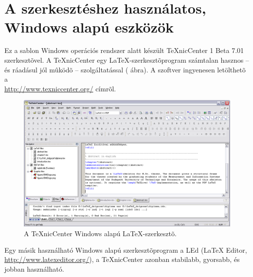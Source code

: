 \section{A szerkesztéshez használatos, Windows alapú eszközök}
Ez a sablon Windows operációs rendszer alatt készült TeXnicCenter 1 Beta 7.01 szerkesztõvel. A TeXnicCenter egy \LaTeX-szerkesztõprogram számtalan hasznos -- és ráadásul jól mûködõ -- szolgáltatással ( ábra). A szoftver ingyenesen letölthetõ a\\\url{http://www.texniccenter.org/} címrõl.

\begin{figure}[!ht]
\centering
\includegraphics[width=150mm, keepaspectratio]{figures/TeXnicCenter.png}
\caption{A TeXnicCenter Windows alapú \LaTeX-szerkesztõ.} 
\label{fig:TexnicCenter}
\end{figure}

Egy másik használható Windows alapú szerkesztõprogram a LEd (LaTeX Editor,\\\url{http://www.latexeditor.org/}), a TeXnicCenter azonban stabilabb, gyorsabb, és jobban használható.

